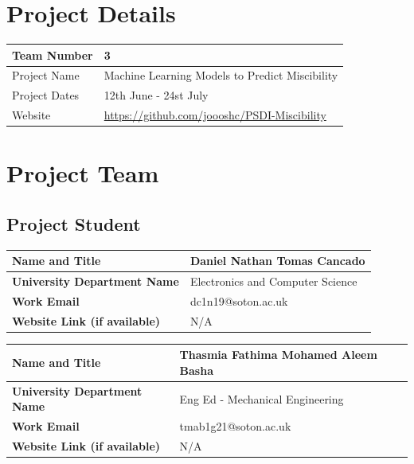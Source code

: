 \documentclass[11pt, titlepage]{article}
\newcommand{\teamnumber}{3\xspace}  %
\newcommand{\projectname}{Machine Learning Models to Predict Miscibility\xspace} %
\begin{document}
\PSDITitlePage{}
\publishinginfo{}
\PSDIContents{}

\setcounter{page}{1}
\section{Project Details}

\begin{table}[H]
\centering
\begin{tabular}{|p{1.5in}|p{4.5in}|}
\hline
Team Number & {\teamnumber} \\
\hline
Project Name & {\projectname} \\
\hline
Project Dates & 12th June - 24st July \\
\hline
Website & 
\href{xxx}{https://github.com/joooshc/PSDI-Miscibility} \\
\hline
\end{tabular}
 \end{table}

\section{Project Team}
\subsection{Project Student}
\begin{table}[H]
    \centering
    \begin{tabular}{|p{2in}|p{4in}|}
        \hline
        \textbf{Name and Title} & Daniel Nathan Tomas Cancado \\
        \hline
        \textbf{University Department Name} & 
        Electronics and Computer Science \\
        \hline
        \textbf{Work Email} & 
        dc1n19@soton.ac.uk \\
        \hline
        \textbf{Website Link (if available)} & 
        N/A \\
        \hline      
    \end{tabular}
\end{table}

\begin{table}[H]
    \centering
    \begin{tabular}{|p{2in}|p{4in}|}
        \hline
        \textbf{Name and Title} & Thasmia Fathima Mohamed Aleem Basha \\
        \hline
        \textbf{University Department Name} & 
        Eng Ed - Mechanical Engineering \\
        \hline
        \textbf{Work Email} & 
        tmab1g21@soton.ac.uk \\
        \hline
        \textbf{Website Link (if available)} & 
        N/A \\
        \hline      
    \end{tabular}
\end{table}
\end{document}
